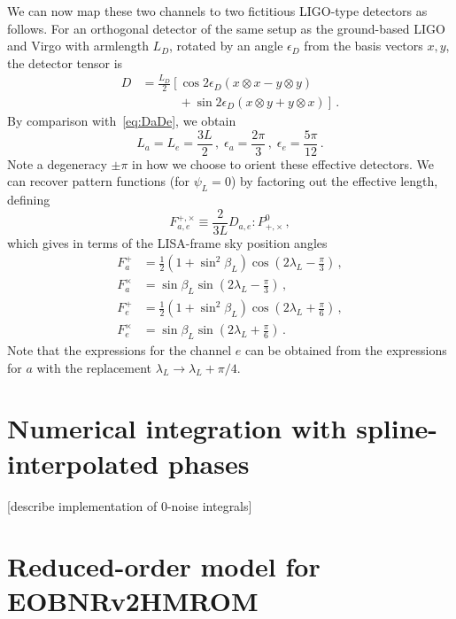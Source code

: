 \documentclass[aps,showpacs,twocolumn,prd,superscriptaddress,nofootinbib]{revtex4-1}
\newcommand{\be}{\begin{equation}}
\newcommand{\ee}{\end{equation}}
\newcommand{\bsub}{\begin{subequations}}
\newcommand{\esub}{\end{subequations}}
\newcommand{\nn}{\nonumber}
\newcommand\lambdaL{{\lambda_{L}}}
\begin{document}
We can now map these two channels to two fictitious LIGO-type detectors as follows. For an orthogonal detector of the same setup as the ground-based LIGO and Virgo with armlength $L_{D}$, rotated by an angle $\epsilon_{D}$ from the basis vectors $x,y$, the detector tensor is
\begin{align}
	D &= \frac{L_{D}}{2} \left[ \cos 2\epsilon_{D} \left( x\otimes x - y\otimes y \right) \right. \nn\\
	& \qquad\quad + \left. \sin 2\epsilon_{D} \left( x\otimes y + y \otimes x\right) \right] \,.
\end{align}
By comparison with~\eqref{eq:DaDe}, we obtain
\be
	L_{a} = L_{e} = \frac{3L}{2} \,, \; \epsilon_{a} = \frac{2\pi}{3} \,, \; \epsilon_{e} = \frac{5\pi}{12} \,.
\ee
Note a degeneracy $\pm \pi$ in how we choose to orient these effective detectors. We can recover pattern functions (for $\psi_{L}=0$) by factoring out the effective length, defining
\be\label{eq:defFapcFepc}
	F_{a,e}^{+,\times} \equiv \frac{2}{3L} D_{a,e} : P_{+,\times}^{0} \,,
\ee
which gives in terms of the LISA-frame sky position angles
\bsub\label{eq:FapcFepc}
\begin{align}
	F_{a}^{+} &= \frac{1}{2} \left( 1 + \sin^{2}\beta_{L} \right) \cos \left(2\lambda_{L} - \frac{\pi}{3} \right) \,,\\
	F_{a}^{\times} &= \sin\beta_{L} \sin \left(2\lambda_{L} - \frac{\pi}{3} \right) \,,\\
	F_{e}^{+} &= \frac{1}{2} \left( 1 + \sin^{2}\beta_{L} \right) \cos \left(2\lambda_{L} + \frac{\pi}{6} \right) \,,\\
	F_{e}^{\times} &= \sin\beta_{L} \sin \left(2\lambda_{L} + \frac{\pi}{6} \right)  \,.
\end{align}
\esub
Note that the expressions for the channel $e$ can be obtained from the expressions for $a$ with the replacement $\lambdaL \rightarrow \lambdaL + \pi/4$.


\section{Numerical integration with spline-interpolated phases}
\label{sec:numintegration}

[describe implementation of 0-noise integrals]


\section{Reduced-order model for EOBNRv2HMROM}
\label{sec:rom}
\end{document}
